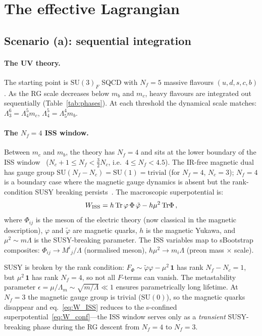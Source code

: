 \documentclass[aps,prd,twocolumn,showpacs,preprintnumbers,superscriptaddress,floatfix]{revtex4-2}
\newcommand{\SU}{\mathrm{SU}}
\newcommand{\Nf}{N_{\!f}}
\newcommand{\Nc}{N_{\!c}}
\newcommand{\Tr}{\mathrm{Tr}}
\begin{document}
\section{The effective Lagrangian}
\label{sec:lagrangian}

\subsection{Scenario (a): sequential integration}

\paragraph{The UV theory.}
The starting point is $\SU(3)_F$ SQCD with $\Nf = 5$ massive
flavours $(u,d,s,c,b)$.
As the RG scale decreases below $m_b$ and $m_c$, heavy flavours
are integrated out sequentially (Table~\ref{tab:phases}).
At each threshold the dynamical scale matches:
$\Lambda_3^6 = \Lambda_4^5 m_c$,
$\Lambda_4^5 = \Lambda_5^4 m_b$.

\paragraph{The $\Nf = 4$ ISS window.}
Between $m_c$ and $m_b$, the theory has $\Nf = 4$ and sits at the
lower boundary of the ISS window~\cite{ISS:2006}
($\Nc {+} 1 \leq \Nf < \frac{3}{2}\Nc$, i.e.\ $4 \leq \Nf < 4.5$).
The IR-free magnetic dual has gauge group
$\SU(\Nf - \Nc) = \SU(1) = \text{trivial}$ (for $\Nf = 4$,
$\Nc = 3$); $\Nf = 4$ is a boundary case where the
magnetic gauge dynamics is absent but the rank-condition
SUSY breaking persists~\cite{ISS:2006}.
The macroscopic superpotential is:
\begin{equation}
  W_{\rm ISS} = h\,\Tr\,\varphi\,\Phi\,\tilde\varphi
  - h\mu^2\,\Tr\Phi\,,
  \label{eq:W_ISS}
\end{equation}
where $\Phi_{ij}$ is the meson of the electric theory (now
classical in the magnetic description), $\varphi$ and
$\tilde\varphi$ are magnetic quarks, $h$ is the magnetic Yukawa,
and $\mu^2 \sim m\Lambda$ is the SUSY-breaking parameter.
The ISS variables map to sBootstrap composites:
$\Phi_{ij} \to M^i{}_j/\Lambda$ (normalised meson),
$h\mu^2 \to m_i\Lambda$ (preon mass $\times$ scale).

SUSY is broken by the rank condition: $F_\Phi \sim
\tilde\varphi\varphi - \mu^2\,\mathbf{1}$ has rank
$\Nf - \Nc = 1$, but $\mu^2\,\mathbf{1}$ has rank $\Nf = 4$,
so not all $F$-terms can vanish.
The metastability parameter
$\epsilon = \mu/\Lambda_m \sim \sqrt{m/\Lambda} \ll 1$ ensures
parametrically long lifetime.
At $\Nf = 3$ the magnetic gauge group is trivial ($\SU(0)$),
so the magnetic quarks disappear and eq.~\eqref{eq:W_ISS}
reduces to the s-confined superpotential~\eqref{eq:W_conf}---the
ISS window serves only as a \emph{transient} SUSY-breaking phase
during the RG descent from $\Nf = 4$ to $\Nf = 3$.
\end{document}
